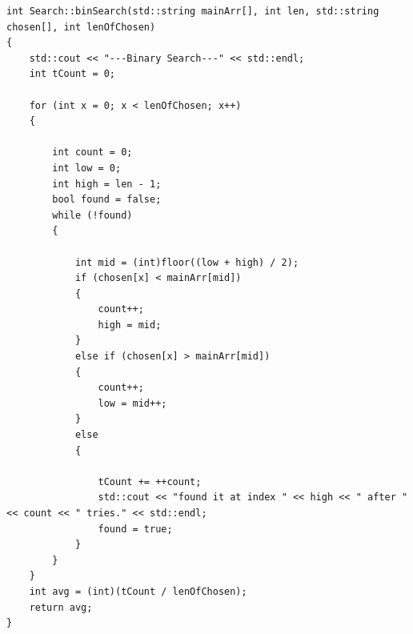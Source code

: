 \documentclass[letterpaper, 10pt]{article}
\begin{document}
\begin{addmargin}[-5em]{1em}
\begin{small}
\begin{verbatim}
int Search::binSearch(std::string mainArr[], int len, std::string chosen[], int lenOfChosen)
{
	std::cout << "---Binary Search---" << std::endl;
	int tCount = 0;

	for (int x = 0; x < lenOfChosen; x++)
	{

		int count = 0;
		int low = 0;
		int high = len - 1;
		bool found = false;
		while (!found)
		{

			int mid = (int)floor((low + high) / 2);
			if (chosen[x] < mainArr[mid])
			{
				count++;
				high = mid;
			}
			else if (chosen[x] > mainArr[mid])
			{
				count++;
				low = mid++;
			}
			else
			{

				tCount += ++count;
				std::cout << "found it at index " << high << " after " << count << " tries." << std::endl;
				found = true;
			}
		}
	}
	int avg = (int)(tCount / lenOfChosen);
	return avg;
}

\end{verbatim}
\end{small}
\end{addmargin}
\end{document}
